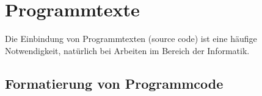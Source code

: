 


\section{Programmtexte}
\label{sec:programmtexte}

Die Einbindung von Programmtexten (source code) ist eine häufige Notwendigkeit,
\va natürlich bei Arbeiten im Bereich der Informatik.


\subsection{Formatierung von Programmcode}
\label{sec:FormatierungVonProgrammcode}

